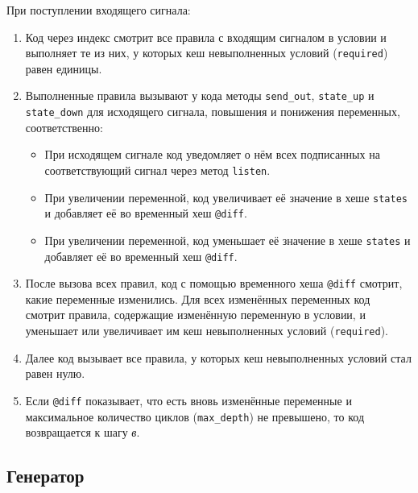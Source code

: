 \documentclass[utf8,a5paper,portrait,10pt,twoside]{eskdtext}
\begin{document}
При поступлении входящего сигнала:
\begin{enumerate}
  \item Код через индекс смотрит все правила с входящим сигналом в условии и
        выполняет те из них, у которых кеш невыполненных условий
        (\texttt{required}) равен единицы.
  \item Выполненные правила вызывают у кода методы \texttt{send\_out},
        \texttt{state\_up} и \texttt{state\_down} для исходящего сигнала,
        повышения и понижения переменных, соответственно:
        \begin{itemize}
          \item При исходящем сигнале код уведомляет о нём всех подписанных
                на соответствующий сигнал через метод \texttt{listen}.
          \item При увеличении переменной, код увеличивает её значение в хеше
                \texttt{states} и добавляет её во временный хеш \texttt{@diff}.
          \item При увеличении переменной, код уменьшает её значение в хеше
                \texttt{states} и добавляет её во временный хеш \texttt{@diff}.
        \end{itemize}
  \item После вызова всех правил, код с помощью временного хеша \texttt{@diff}
        смотрит, какие переменные изменились. Для всех изменённых переменных
        код смотрит правила, содержащие изменённую переменную в условии, и
        уменьшает или увеличивает им кеш невыполненных условий
        (\texttt{required}).
  \item Далее код вызывает все правила, у которых кеш невыполненных условий
        стал равен нулю.
  \item Если \texttt{@diff} показывает, что есть вновь изменённые переменные и
        максимальное количество циклов (\texttt{max\_depth}) не превышено, то
        код возвращается к шагу \textit{в}.
\end{enumerate}

\subsection{Генератор}
\end{document}
